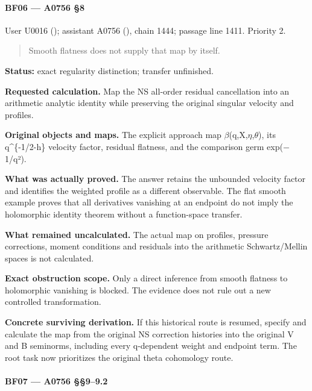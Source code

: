 \paragraph{BF06 --- A0756 §8}\label{bf06-a0756-8}

User U0016 (\protect{});
assistant A0756 (\protect{}),
chain 1444; passage line 1411. Priority 2.

\begin{quote}
Smooth flatness does not supply that map by itself.
\end{quote}

\textbf{Status:} exact regularity distinction; transfer unfinished.

\textbf{Requested calculation.} Map the NS all-order residual
cancellation into an arithmetic analytic identity while preserving the
original singular velocity and profiles.

\textbf{Original objects and maps.} The explicit approach map
\allowbreak{}\ensuremath{β}\allowbreak{}(q,X,\allowbreak{}\ensuremath{η}\allowbreak{},\allowbreak{}\ensuremath{θ}\allowbreak{}),
its q\^{}\{-1/2-h\} velocity factor, residual flatness, and the
comparison germ exp(\allowbreak{}\ensuremath{−}\allowbreak{}1/q²).

\textbf{What was actually proved.} The answer retains the unbounded
velocity factor and identifies the weighted profile as a different
observable. The flat smooth example proves that all derivatives
vanishing at an endpoint do not imply the holomorphic identity theorem
without a function-space transfer.

\textbf{What remained uncalculated.} The actual map on profiles,
pressure corrections, moment conditions and residuals into the
arithmetic Schwartz/Mellin spaces is not calculated.

\textbf{Exact obstruction scope.} Only a direct inference from smooth
flatness to holomorphic vanishing is blocked. The evidence does not rule
out a new controlled transformation.

\textbf{Concrete surviving derivation.} If this historical route is
resumed, specify and calculate the map from the original NS correction
histories into the original V and B seminorms, including every
q-dependent weight and endpoint term. The root task now prioritizes the
original theta cohomology route.

\paragraph{BF07 --- A0756 §§9--9.2}\label{bf07-a0756-99.2}

